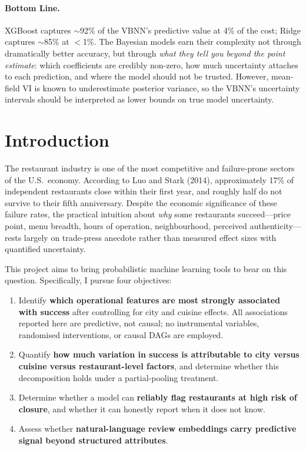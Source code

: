 \documentclass[10pt, letterpaper]{article}
\begin{document}
\paragraph{Bottom Line.} XGBoost captures $\sim$92\% of the VBNN's predictive value at 4\% of the cost; Ridge captures $\sim$85\% at $<$1\%. The Bayesian models earn their complexity not through dramatically better accuracy, but through \emph{what they tell you beyond the point estimate}: which coefficients are credibly non-zero, how much uncertainty attaches to each prediction, and where the model should not be trusted. However, mean-field VI is known to underestimate posterior variance, so the VBNN's uncertainty intervals should be interpreted as lower bounds on true model uncertainty.

\section{Introduction}

The restaurant industry is one of the most competitive and failure-prone sectors of the U.S.\ economy. According to Luo and Stark (2014), approximately 17\% of independent restaurants close within their first year, and roughly half do not survive to their fifth anniversary. Despite the economic significance of these failure rates, the practical intuition about \emph{why} some restaurants succeed---price point, menu breadth, hours of operation, neighbourhood, perceived authenticity---rests largely on trade-press anecdote rather than measured effect sizes with quantified uncertainty.

This project aims to bring probabilistic machine learning tools to bear on this question. Specifically, I pursue four objectives:
\begin{enumerate}
  \item Identify \textbf{which operational features are most strongly associated with success} after controlling for city and cuisine effects. All associations reported here are predictive, not causal; no instrumental variables, randomised interventions, or causal DAGs are employed.
  \item Quantify \textbf{how much variation in success is attributable to city versus cuisine versus restaurant-level factors}, and determine whether this decomposition holds under a partial-pooling treatment.
  \item Determine whether a model can \textbf{reliably flag restaurants at high risk of closure}, and whether it can honestly report when it does not know.
  \item Assess whether \textbf{natural-language review embeddings carry predictive signal beyond structured attributes}.
\end{enumerate}
\end{document}
